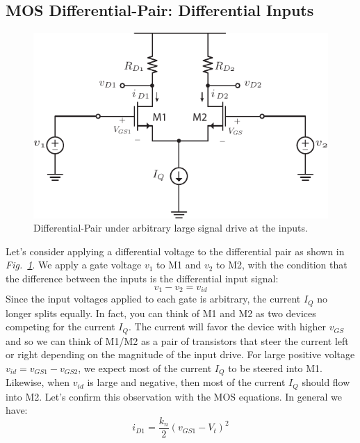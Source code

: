 \subsection{MOS Differential-Pair:  Differential Inputs}
\begin{figure}[tb]
\centering
\includegraphics[scale=1]{Diffamp_large_signal.pdf}
\caption{Differential-Pair under arbitrary large signal drive at the inputs.}
\label{fig:Diff_amp_large}
\end{figure}
Let's consider applying a differential voltage to the differential pair as shown in \emph{Fig.~\ref{fig:Diff_amp_large}}.  We apply a gate voltage $v_1$ to M1 and $v_2$ to M2, with the condition that the difference between the inputs is the differential input signal:
    \begin{equation}
        v_1 - v_2 = v_{id}
    \end{equation}
Since the input voltages applied to each gate is arbitrary, the current $I_Q$ no longer splits equally.  In fact, you can think of M1 and M2 as two devices competing for the current $I_Q$.  The current will favor the device with higher $v_{GS}$ and so we can think of M1/M2 as a pair of transistors that steer the current left or right depending on the magnitude of the input drive.  For large positive voltage $v_{id} = v_{GS1} - v_{GS2}$, we expect most of the current $I_Q$ to be steered into M1.  Likewise, when $v_{id}$ is large and negative, then most of the current $I_Q$ should flow into M2.  Let's confirm this observation with the MOS equations.  In general we have:
    \begin{equation}
        {i_{D1}} = \frac{{{k_n}}}{2}{\left( {{v_{GS1}} - {V_t}} \right)^2}
    \end{equation}
